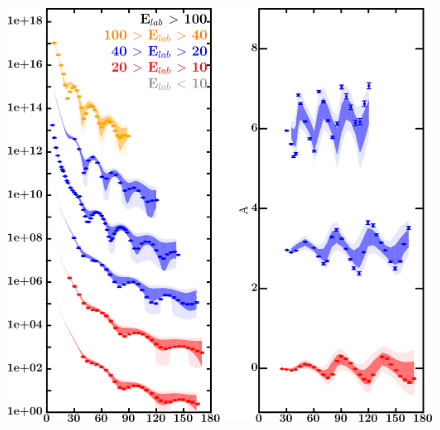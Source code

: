 \documentclass[twocolumn,secnumarabic,amssymb, nobibnotes, aps, prl,
superscriptaddress, nobalancelastpage]{revtex4}
\begin{document}
\begin{figure}[!htb]
    \centering
    \begin{minipage}{0.4\linewidth}
        \centering
        \includegraphics[width=\linewidth]{figures/sn124_protonElastic.png}
        \label{DOM_sn124_proton_elastic}
    \end{minipage}\hspace{6pt}
    \begin{minipage}{0.4\linewidth}
        \centering

\end{minipage}
\end{figure}
\end{document}
